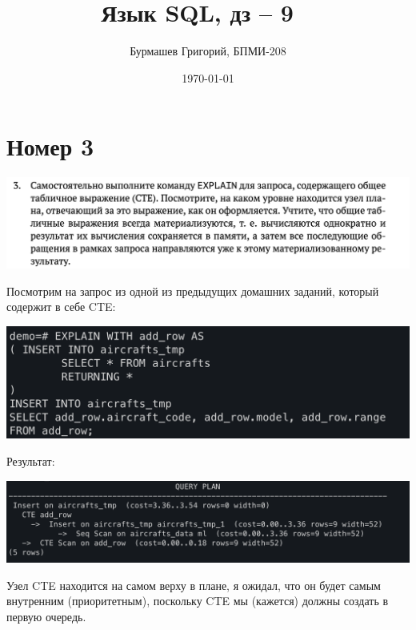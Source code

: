 \documentclass[a4paper,12pt]{article}
\author{Бурмашев Григорий, БПМИ-208}
\title{Язык SQL,  дз -- 9  }
\date{\today}
\begin{document}
\maketitle
\section*{Номер 3}
\begin{center}
\includegraphics[scale=0.4]{t3.png}
\end{center}
Посмотрим на запрос из одной из предыдущих домашних заданий, который содержит в себе CTE:
\begin{center}
\includegraphics[scale=0.6]{31.png}
\end{center}
Результат:
\begin{center}
\includegraphics[scale=0.5]{32.png}
\end{center}
Узел CTE находится на самом верху в плане, я ожидал, что он будет самым внутренним (приоритетным), поскольку CTE мы (кажется) должны создать в первую очередь.
\clearpage
\end{document}
